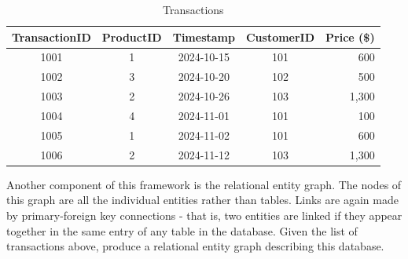 \documentclass{article}
\numberwithin{figure}{section}
\begin{document}
\begin{table}[H]
\centering
\caption{Transactions}
\begin{tabular}{|c|c|c|c|r|}
\hline
\textbf{TransactionID} & \textbf{ProductID} & \textbf{Timestamp} & \textbf{CustomerID} & \textbf{Price (\$)} \\
\hline
1001 & 1 & 2024-10-15 & 101 & 600 \\
1002 & 3 & 2024-10-20 & 102 & 500 \\
1003 & 2 & 2024-10-26 & 103 & 1,300 \\
1004 & 4 & 2024-11-01 & 101 & 100 \\
1005 & 1 & 2024-11-02 & 101 & 600 \\
1006 & 2 & 2024-11-12 & 103 & 1,300 \\
\hline
\end{tabular}
\end{table}

Another component of this framework is the relational entity graph. The nodes of this graph are all the individual entities rather than tables.  Links are again made by primary-foreign key connections - that is, two entities are linked if they appear together in the same entry of any table in the database. Given the list of transactions above, produce a relational entity graph describing this database.
\end{document}
